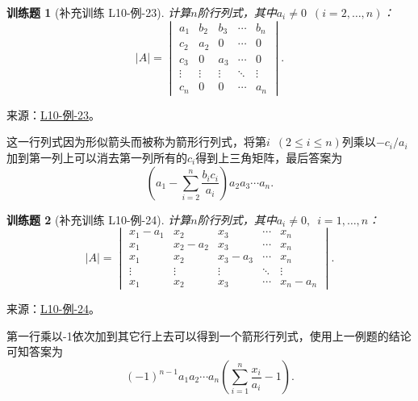 \documentclass[UTF8,12pt,a4paper,fontset=fandol]{ctexart}
\newtheorem{exercise}{训练题}[section]
\begin{document}
\begin{exercise}[补充训练 L10-例-23]\label{prob:L10-例-23}
计算$n$阶行列式，其中$a_i\neq 0\enspace(i=2,\ldots,n)$：
    \[|A|=\begin{vmatrix}
            a_1    & b_2    & b_3    & \cdots & b_n    \\
            c_2    & a_2    & 0      & \cdots & 0      \\
            c_3    & 0      & a_3    & \cdots & 0      \\
            \vdots & \vdots & \vdots & \ddots & \vdots \\
            c_n    & 0      & 0      & \cdots & a_n
        \end{vmatrix}.\]
\end{exercise}
\noindent 来源：\href{https://github.com/yhwu-is/Linear-Algebra-Left-Undone/blob/new/%E8%AE%B2%E4%B9%89/%E4%B8%93%E9%A2%98/10%20%E8%A1%8C%E5%88%97%E5%BC%8F.tex}{L10-例-23}。
\begin{solve}
这一行列式因为形似箭头而被称为箭形行列式，将第$i\enspace(2\leqslant i\leqslant n)$列乘以$-c_i/a_i$加到第一列上可以消去第一列所有的$c_i$得到上三角矩阵，最后答案为
    \[
    (a_1-\sum\limits_{i=2}^n\dfrac{b_ic_i}{a_i})a_2a_3\cdots a_n.
    \]
\end{solve}

\begin{exercise}[补充训练 L10-例-24]\label{prob:L10-例-24}
计算$n$阶行列式，其中$a_i\neq 0,\enspace i=1,\ldots,n$：
    \[|A|=\begin{vmatrix}
            x_1-a_1 & x_2     & x_3     & \cdots & x_n     \\
            x_1     & x_2-a_2 & x_3     & \cdots & x_n     \\
            x_1     & x_2     & x_3-a_3 & \cdots & x_n     \\
            \vdots  & \vdots  & \vdots  & \ddots & \vdots  \\
            x_1     & x_2     & x_3     & \cdots & x_n-a_n
        \end{vmatrix}.\]
\end{exercise}
\noindent 来源：\href{https://github.com/yhwu-is/Linear-Algebra-Left-Undone/blob/new/%E8%AE%B2%E4%B9%89/%E4%B8%93%E9%A2%98/10%20%E8%A1%8C%E5%88%97%E5%BC%8F.tex}{L10-例-24}。
\begin{solve}
第一行乘以-1依次加到其它行上去可以得到一个箭形行列式，使用上一例题的结论可知答案为\[(-1)^{n-1}a_1a_2\cdots a_n(\sum\limits_{i=1}^n\dfrac{x_i}{a_i}-1).\]
\end{solve}
\end{document}
